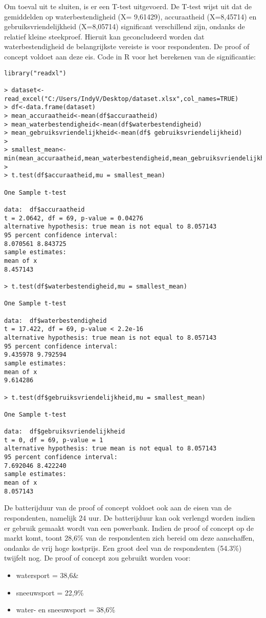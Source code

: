 Om toeval uit te sluiten, is er een T-test uitgevoerd.
De T-test wijst uit dat de gemiddelden op waterbestendigheid (X= 9,61429), accuraatheid (X=8,45714) en gebruiksvriendelijkheid (X=8,05714) significant verschillend zijn, ondanks de relatief kleine steekproef. Hieruit kan geconcludeerd worden dat waterbestendigheid de belangrijkste vereiste is voor respondenten. De proof of concept voldoet aan deze eis.
\newline
\newline
Code in R voor het berekenen van de significantie:
\begin{verbatim}
library("readxl")

> dataset<-read_excel("C:/Users/IndyV/Desktop/dataset.xlsx",col_names=TRUE)
> df<-data.frame(dataset)
> mean_accuraatheid<-mean(df$accuraatheid)
> mean_waterbestendigheid<-mean(df$waterbestendigheid)
> mean_gebruiksvriendelijkheid<-mean(df$ gebruiksvriendelijkheid)
> 
> smallest_mean<-min(mean_accuraatheid,mean_waterbestendigheid,mean_gebruiksvriendelijkheid)
> 
> t.test(df$accuraatheid,mu = smallest_mean)

One Sample t-test

data:  df$accuraatheid
t = 2.0642, df = 69, p-value = 0.04276
alternative hypothesis: true mean is not equal to 8.057143
95 percent confidence interval:
8.070561 8.843725
sample estimates:
mean of x 
8.457143 

> t.test(df$waterbestendigheid,mu = smallest_mean)

One Sample t-test

data:  df$waterbestendigheid
t = 17.422, df = 69, p-value < 2.2e-16
alternative hypothesis: true mean is not equal to 8.057143
95 percent confidence interval:
9.435978 9.792594
sample estimates:
mean of x 
9.614286 

> t.test(df$gebruiksvriendelijkheid,mu = smallest_mean)

One Sample t-test

data:  df$gebruiksvriendelijkheid
t = 0, df = 69, p-value = 1
alternative hypothesis: true mean is not equal to 8.057143
95 percent confidence interval:
7.692046 8.422240
sample estimates:
mean of x 
8.057143 
\end{verbatim}
De batterijduur van de proof of concept voldoet ook aan de eisen van de respondenten, namelijk 24 uur. De batterijduur kan ook verlengd worden indien er gebruik gemaakt wordt van een powerbank.
\newline
Indien de proof of concept op de markt komt, toont 28,6\% van de respondenten zich bereid om deze aanschaffen, ondanks de vrij hoge kostprijs. Een groot deel van de respondenten (54.3\%) twijfelt nog. 
\newline
De proof of concept zou gebruikt worden voor:
\begin{itemize}
	\item watersport = 38,6\&
	\item sneeuwsport = 22,9\%
	\item water- en sneeuwsport = 38,6\%
\end{itemize}
\pagebreak
